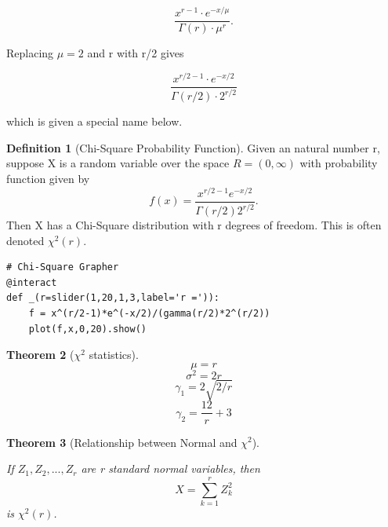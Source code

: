 \documentclass[10pt,]{book}
\theoremstyle{plain}
\newtheorem{theorem}{Theorem}[section]
\theoremstyle{definition}
\newtheorem{definition}[theorem]{Definition}
\theoremstyle{definition}
\theoremstyle{definition}
\numberwithin{equation}{section}
\begin{document}
	\begin{equation*}\frac{x^{r-1} \cdot e^{-x / \mu}}{\Gamma(r) \cdot \mu^r}.\end{equation*}

Replacing \(\mu = 2\) and r with r/2 gives

	\begin{equation*}\frac{x^{r/2-1} \cdot e^{-x/2}}{\Gamma(r/2) \cdot 2^{r/2}}\end{equation*}

which is given a special name below.
\par


	\begin{definition}[{Chi-Square Probability Function}]\label{definition-33}
Given an natural number r, suppose X is a random variable over the space \(R = (0,\infty)\) with probability function given by
	\begin{equation*}f(x) = \frac{x^{r/2-1} e^{-x/2} }{\Gamma(r/2) 2^{r/2}}.\end{equation*}
	Then X has a Chi-Square distribution with r degrees of freedom. This is often denoted \(\chi^2(r)\).
	\end{definition}


\begin{lstlisting}[style=sageinput]
# Chi-Square Grapher
@interact
def _(r=slider(1,20,1,3,label='r =')):
    f = x^(r/2-1)*e^(-x/2)/(gamma(r/2)*2^(r/2))
    plot(f,x,0,20).show()
\end{lstlisting}


	\begin{theorem}[{\(\chi^2\) statistics}]\label{theorem-61}
\begin{equation*}\mu = r\end{equation*}\begin{equation*}\sigma^2 = 2r\end{equation*}\begin{equation*}\gamma_1 = 2 \sqrt{2/r}\end{equation*}\begin{equation*}\gamma_2 = \frac{12}{r} + 3\end{equation*}\end{theorem}

	
	\begin{theorem}[{Relationship between Normal and \(\chi^2\)}]\label{theorem-62}

	If \(Z_1, Z_2, ..., Z_r\) are r standard normal variables, then
	\begin{equation*} X = \sum_{k=1}^r Z_k^2\end{equation*}
	is \(\chi^2(r)\).
	\end{theorem}
\end{document}
